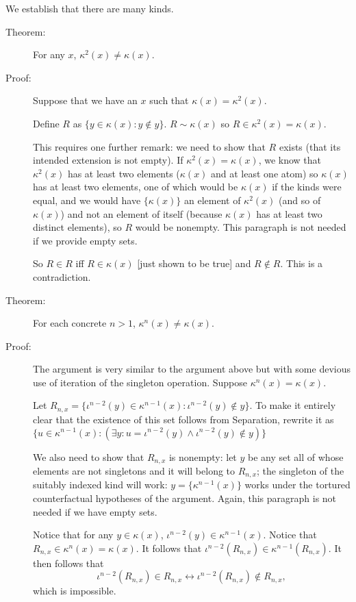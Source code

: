 \documentclass[12pt]{article}
\begin{document}
We establish that there are many kinds.

\begin{description}

\item[Theorem:]  For any $x$, $\kappa^2(x) \neq \kappa(x)$.

\item[Proof:]  Suppose that we have an $x$ such that $\kappa(x) = \kappa^2(x)$.

Define $R$ as $\{y \in \kappa(x):y \not\in y\}$.  $R \sim \kappa(x)$ so $R \in \kappa^2(x) = \kappa(x)$.

This requires one further remark:  we need to show that $R$ exists (that its intended extension is not empty).  If $\kappa^2(x)=\kappa(x)$,
we know that $\kappa^2(x)$ has at least two elements ($\kappa(x)$ and at least one atom) so
$\kappa(x)$ has at least two elements, one of which would be $\kappa(x)$ if the kinds were equal,
and we would have $\{\kappa(x)\}$ an element of $\kappa^2(x)$ (and so of $\kappa(x)$) and not an element of itself (because $\kappa(x)$ has at least two distinct elements), so $R$ would be nonempty.  This paragraph is not needed if we provide empty sets.

So $R \in R$ iff $R \in \kappa(x)$ [just shown to be true] and $R \not\in R$.  This is a contradiction.



\item[Theorem:]  For each concrete $n>1$, $\kappa^n(x) \neq \kappa(x)$.

\item[Proof:]  The argument is very similar to the argument above but with some devious use of iteration of the singleton operation.  Suppose $\kappa^n(x)=\kappa(x)$.

Let $R_{n,x} = \{\iota^{n-2}(y)\in \kappa^{n-1}(x):\iota^{n-2}(y) \not\in y\}$.  To make it entirely clear that the existence of this set follows from Separation, rewrite it as $\{u\in \kappa^{n-1}(x):(\exists y:u = \iota^{n-2}(y) \wedge \iota^{n-2}(y) \not\in y)\}$ 

We also need to show that $R_{n,x}$ is nonempty:  let $y$ be any set all of whose elements are not singletons
and it will belong to $R_{n,x}$;  the singleton of the suitably indexed kind will work:  $y = \{\kappa^{n-1}(x)\}$ works under the tortured counterfactual hypotheses of the argument.  Again, this paragraph is not needed if we have empty sets.

Notice that
for any $y \in \kappa(x)$, $\iota^{n-2}(y)\in \kappa^{n-1}(x)$.  Notice that $R_{n,x} \in \kappa^n(x) = \kappa(x)$.  It follows that $\iota^{n-2}(R_{n,x})\in \kappa^{n-1}(R_{n,x})$.  It then follows that
$$\iota^{n-2}(R_{n,x})\in R_{n,x} \leftrightarrow \iota^{n-2}(R_{n,x}) \not\in R_{n,x},$$ which is impossible.




\end{description}
\end{document}
